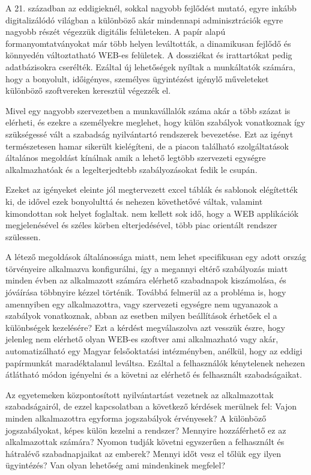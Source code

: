 
A 21. században az eddigieknél, sokkal nagyobb fejlődést mutató, egyre inkább digitalizálódó világban a különböző akár mindennapi adminisztrációk egyre nagyobb részét végezzük digitális felületeken.
A papír alapú formanyomtatványokat már több helyen leváltották, a dinamikusan fejlődő és könnyedén változtatható WEB-es felületek. A dossziékat és irattartókat pedig adatbázisokra cserélték.
Ezáltal új lehetőségek nyíltak a munkáltatók számára, hogy a bonyolult, időigényes, személyes ügyintézést igénylő műveleteket különböző szoftvereken keresztül végezzék el.

Mivel egy nagyobb szervezetben a munkavállalók száma akár a több százat is elérheti, és ezekre a személyekre meglehet, hogy külön szabályok vonatkoznak így szükségessé vált a szabadság nyilvántartó rendszerek bevezetése.
Ezt az igényt természetesen hamar sikerült kielégíteni, de a piacon található szolgáltatások általános megoldást kínálnak amik a lehető legtöbb szervezeti egységre alkalmazhatóak és a legelterjedtebb szabályozásokat fedik le csupán.

Ezeket az igényeket eleinte jól megtervezett excel táblák és sablonok elégítették ki, de idővel ezek bonyolulttá és nehezen követhetővé váltak, valamint kimondottan sok helyet foglaltak. nem kellett sok idő, hogy a WEB applikációk megjelenésével és széles körben elterjedésével, több piac orientált rendszer szülessen.

A létező megoldások általánossága miatt, nem lehet specifikusan egy adott ország törvényeire alkalmazva konfigurálni, így a megannyi eltérő szabályozás miatt minden évben az alkalmazott számára elérhető szabadnapok kiszámolása, és jóváírása többnyire kézzel történik. Továbbá felmerül az a probléma is, hogy amennyiben egy alkalmazottra, vagy szervezeti egységre nem ugyanazok a szabályok vonatkoznak, abban az esetben milyen beállítások érhetőek el a különbségek kezelésére? Ezt a kérdést megválaszolva azt vesszük észre, hogy jelenleg nem elérhető olyan WEB-es szoftver ami alkalmazható vagy akár, automatizálható egy Magyar felsőoktatási intézményben, anélkül, hogy az eddigi papírmunkát maradéktalanul leváltsa. Ezáltal a felhasználók kénytelenek nehezen átlátható módon igényelni és a követni az elérhető és felhasznált szabadságaikat.

Az egyetemeken központosított nyilvántartást vezetnek az alkalmazottak szabadságairól, de ezzel kapcsolatban a következő kérdések merülnek fel: Vajon minden alkalmazottra egyforma jogszabályok érvényesek? A különböző jogszabályokat, képes külön kezelni a rendszer? Mennyire hozzáférhető ez az alkalmazottak számára? Nyomon tudják követni egyszerűen a felhasznált és hátralévő szabadnapjaikat az emberek? Mennyi időt vesz el tőlük egy ilyen ügyintézés? Van olyan lehetőség ami mindenkinek megfelel?

